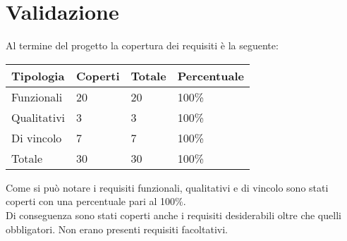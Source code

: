 \section{Validazione}
Al termine del progetto la copertura dei requisiti è la seguente:
\begin{table}[H]
  \begin{tabular}{|p{5.2cm}|p{1.5cm}|p{1.3cm}|p{2.3cm}|} 
  \hline
  \textbf{Tipologia} & \textbf{Coperti} & \textbf{Totale} &  \textbf{Percentuale} \\ 
  \hline
  Funzionali & 20 & 20 & 100\% \\ 
  \hline
  Qualitativi & 3 & 3 & 100\% \\ 
  \hline
  Di vincolo & 7 & 7 & 100\% \\ 
  \hline
  \hline
  Totale & 30 & 30 & 100\% \\ 
  \hline
  \end{tabular}
\end{table}
\leavevmode\newline
Come si può notare i requisiti funzionali, qualitativi e di vincolo sono stati coperti con una percentuale pari al 100\%.
\\
Di conseguenza sono stati coperti anche i requisiti desiderabili oltre che quelli obbligatori. Non erano presenti requisiti 
facoltativi.